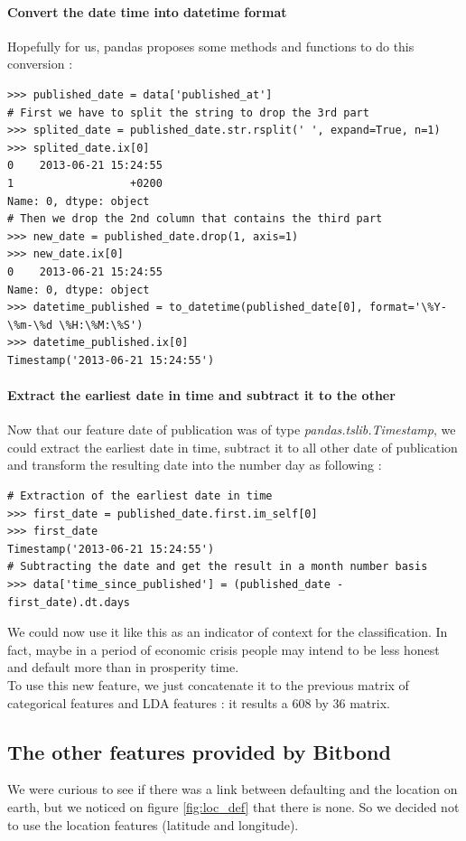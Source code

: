 		\paragraph{Convert the date time into datetime format}
			Hopefully for us, pandas proposes some methods and functions to do this conversion :
		\begin{verbatim}
>>> published_date = data['published_at']
# First we have to split the string to drop the 3rd part
>>> splited_date = published_date.str.rsplit(' ', expand=True, n=1)
>>> splited_date.ix[0]
0    2013-06-21 15:24:55
1                  +0200
Name: 0, dtype: object
# Then we drop the 2nd column that contains the third part
>>> new_date = published_date.drop(1, axis=1)
>>> new_date.ix[0]
0    2013-06-21 15:24:55
Name: 0, dtype: object
>>> datetime_published = to_datetime(published_date[0], format='\%Y-\%m-\%d \%H:\%M:\%S')
>>> datetime_published.ix[0]
Timestamp('2013-06-21 15:24:55')
		\end{verbatim}

		\paragraph{Extract the earliest date in time and subtract it to the other}
		Now that our feature date of publication was of type \textit{pandas.tslib.Timestamp}, we could extract the earliest date in time, subtract it to all other date of publication and transform the resulting date into the number day as following :
		\begin{verbatim}
# Extraction of the earliest date in time
>>> first_date = published_date.first.im_self[0]
>>> first_date
Timestamp('2013-06-21 15:24:55')
# Subtracting the date and get the result in a month number basis
>>> data['time_since_published'] = (published_date - first_date).dt.days
		\end{verbatim}
		We could now use it like this as an indicator of context for the classification. In fact, maybe in a period of economic crisis people may intend to be less honest and default more than in prosperity time.\\

		To use this new feature, we just concatenate it to the previous matrix of categorical features and LDA features : it results a 608 by 36 matrix.


	\subsection{The other features provided by Bitbond}
		We were curious to see if there was a link between defaulting and the location on earth, but we noticed on figure \ref{fig:loc_def} that there is none. So we decided not to use the location features (latitude and longitude).\\


